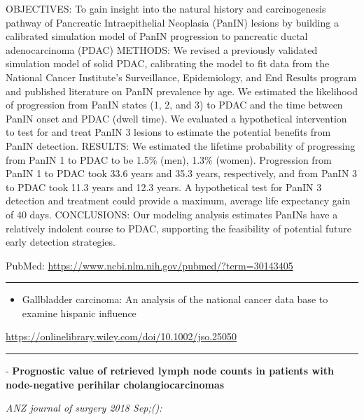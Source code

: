 \documentclass[]{article}
\providecommand{\tightlist}{%
  \setlength{\itemsep}{0pt}\setlength{\parskip}{0pt}}
\begin{document}
OBJECTIVES: To gain insight into the natural history and carcinogenesis
pathway of Pancreatic Intraepithelial Neoplasia (PanIN) lesions by
building a calibrated simulation model of PanIN progression to
pancreatic ductal adenocarcinoma (PDAC) METHODS: We revised a previously
validated simulation model of solid PDAC, calibrating the model to fit
data from the National Cancer Institute's Surveillance, Epidemiology,
and End Results program and published literature on PanIN prevalence by
age. We estimated the likelihood of progression from PanIN states (1, 2,
and 3) to PDAC and the time between PanIN onset and PDAC (dwell time).
We evaluated a hypothetical intervention to test for and treat PanIN 3
lesions to estimate the potential benefits from PanIN detection.
RESULTS: We estimated the lifetime probability of progressing from PanIN
1 to PDAC to be 1.5\% (men), 1.3\% (women). Progression from PanIN 1 to
PDAC took 33.6 years and 35.3 years, respectively, and from PanIN 3 to
PDAC took 11.3 years and 12.3 years. A hypothetical test for PanIN 3
detection and treatment could provide a maximum, average life expectancy
gain of 40 days. CONCLUSIONS: Our modeling analysis estimates PanINs
have a relatively indolent course to PDAC, supporting the feasibility of
potential future early detection strategies.

PubMed: \url{https://www.ncbi.nlm.nih.gov/pubmed/?term=30143405}

{}

{}

\begin{center}\rule{0.5\linewidth}{\linethickness}\end{center}

\begin{itemize}
\tightlist
\item
  Gallbladder carcinoma: An analysis of the national cancer data base to
  examine hispanic influence
\end{itemize}

\url{https://onlinelibrary.wiley.com/doi/10.1002/jso.25050}

\begin{center}\rule{0.5\linewidth}{\linethickness}\end{center}

 - \textbf{Prognostic value of retrieved lymph node counts in patients
with node-negative perihilar cholangiocarcinomas}

\emph{ANZ journal of surgery 2018 Sep;():}
\end{document}
